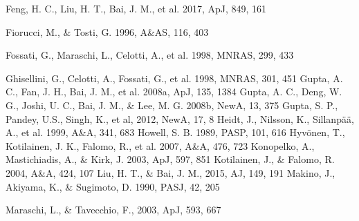 \documentclass[structabstract]{raa}
\begin{document}
\begin{thebibliography}{99}
 Feng, H. C., Liu, H. T., Bai, J. M., et al. 2017, ApJ, 849, 161 

 Fiorucci, M., \& Tosti, G. 1996, A\&AS, 116, 403

 Fossati, G., Maraschi, L., Celotti, A., et al. 1998, MNRAS, 299, 433

 Ghisellini, G., Celotti, A., Fossati, G., et al. 1998, MNRAS, 301, 451
 Gupta, A. C., Fan, J. H., Bai, J. M., et al. 2008a, ApJ, 135, 1384
 Gupta, A. C., Deng, W. G., Joshi, U. C., Bai, J. M., \& Lee, M. G. 2008b, NewA, 13, 375
 Gupta, S. P., Pandey, U.S., Singh, K., et al, 2012, NewA, 17, 8
 Heidt, J., Nilsson, K., Sillanp\"{a}\"{a}, A., et al. 1999, A\&A, 341, 683
 Howell, S. B. 1989, PASP, 101, 616
 Hyv\"{o}nen, T., Kotilainen, J. K., Falomo, R., et al. 2007, A\&A, 476, 723
 Konopelko, A., Mastichiadis, A., \& Kirk, J. 2003, ApJ, 597, 851
 Kotilainen, J., \& Falomo, R. 2004, A\&A, 424, 107
 Liu, H. T., \& Bai, J. M., 2015, AJ, 149, 191
 Makino, J., Akiyama, K., \& Sugimoto, D. 1990, PASJ, 42, 205

 Maraschi, L., \& Tavecchio, F., 2003, ApJ, 593, 667


\end{thebibliography}
\end{document}
